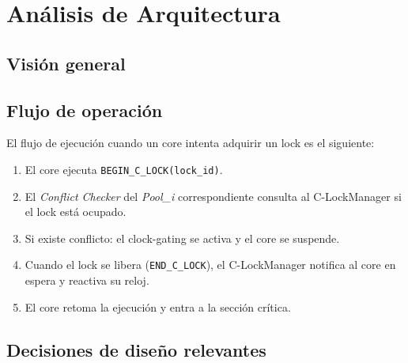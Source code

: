
\section{Análisis de Arquitectura}

\subsection{Visión general}


\subsection{Flujo de operación}

El flujo de ejecución cuando un core intenta adquirir un lock es el siguiente:

\begin{enumerate}
    \item El core ejecuta \texttt{BEGIN\_C\_LOCK(lock\_id)}.
    \item El \textit{Conflict Checker} del \textit{Pool\_i} correspondiente consulta
          al C-LockManager si el lock está ocupado.
    \item Si existe conflicto: el clock-gating se activa y el core se suspende.
    \item Cuando el lock se libera (\texttt{END\_C\_LOCK}), el C-LockManager notifica
          al core en espera y reactiva su reloj.
    \item El core retoma la ejecución y entra a la sección crítica.
\end{enumerate}

\subsection{Decisiones de diseño relevantes}


